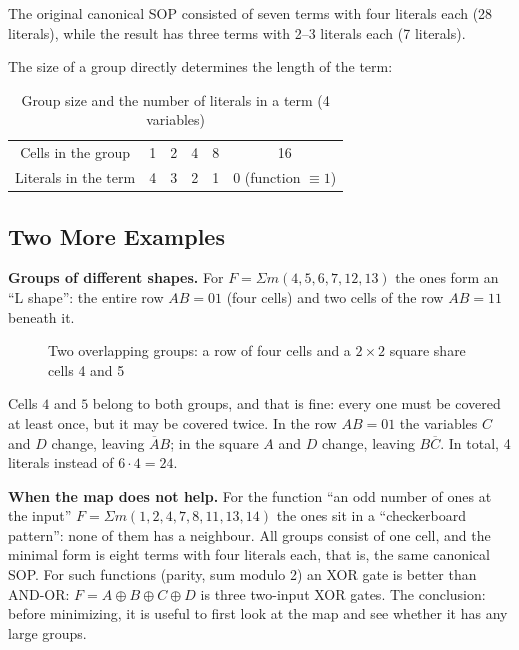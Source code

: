 The original canonical SOP consisted of seven terms with four literals each
(28 literals), while the result has three terms with 2--3 literals each
(7 literals).

The size of a group directly determines the length of the term:

\begin{table}[H]
\centering
\caption{Group size and the number of literals in a term (4 variables)}
\begin{tabular}{c|ccccc}
\toprule
Cells in the group & 1 & 2 & 4 & 8 & 16 \\
Literals in the term & 4 & 3 & 2 & 1 & 0 (function $\equiv 1$) \\
\bottomrule
\end{tabular}
\end{table}

\subsection{Two More Examples}

\textbf{Groups of different shapes.} For $F=\Sigma m(4,5,6,7,12,13)$ the ones
form an ``L shape'': the entire row $AB=01$ (four cells) and two cells of the
row $AB=11$ beneath it.

\begin{figure}[H]
\centering
{}
\caption{Two overlapping groups: a row of four cells and a $2\times 2$ square share cells 4 and 5}
\label{fig:karnaugh4_corner}
\end{figure}

Cells $4$ and $5$ belong to both groups, and that is fine: every one must be
covered at least once, but it may be covered twice. In the row $AB=01$ the
variables $C$ and $D$ change, leaving $\overline{A}B$; in the square $A$ and
$D$ change, leaving $B\overline{C}$. In total, 4 literals instead of
$6\cdot4=24$.

\textbf{When the map does not help.} For the function ``an odd number of
ones at the input'' $F=\Sigma m(1,2,4,7,8,11,13,14)$ the ones sit in a
``checkerboard pattern'': none of them has a neighbour. All groups consist of
one cell, and the minimal form is eight terms with four literals each, that
is, the same canonical SOP. For such functions (parity, sum modulo 2) an XOR
gate is better than AND-OR: $F=A\oplus B\oplus C\oplus D$ is three two-input
XOR gates. The conclusion: before minimizing, it is useful to first look at
the map and see whether it has any large groups.


